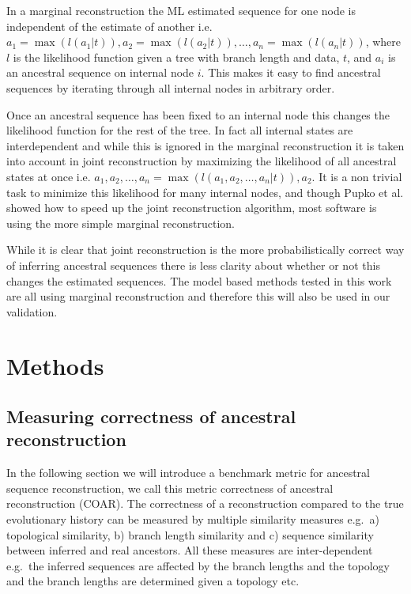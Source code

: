 In a marginal reconstruction the ML estimated sequence for one node is independent of the estimate of another i.e. $a_1 = \operatorname{max}(l(a_1 | t)), a_2 = \operatorname{max}(l(a_2 | t)), \hdots, a_n = \operatorname{max}(l(a_n | t))$, where $l$ is the likelihood function given a tree with branch length and data, $t$, and $a_i$ is an ancestral sequence on internal node $i$.
This makes it easy to find ancestral sequences by iterating through all internal nodes in arbitrary order.

Once an ancestral sequence has been fixed to an internal node this changes the likelihood function for the rest of the tree.
In fact all internal states are interdependent and while this is ignored in the marginal reconstruction it is taken into account in joint reconstruction by maximizing the likelihood of all ancestral states at once i.e. $a_1, a_2, \hdots, a_n = \operatorname{max}(l(a_1, a_2, \hdots, a_n | t)), a_2$.
It is a non trivial task to minimize this likelihood for many internal nodes, and though Pupko et al. \cite{pupko2000fast} showed how to speed up the joint reconstruction algorithm, most software is using the more simple marginal reconstruction.

While it is clear that joint reconstruction is the more probabilistically correct way of inferring ancestral sequences there is less clarity about whether or not this changes the estimated sequences.
The model based methods tested in this work are all using marginal reconstruction and therefore this will also be used in our validation.






\section{Methods}

\subsection{Measuring correctness of ancestral reconstruction}
In the following section we will introduce a benchmark metric for ancestral sequence reconstruction, we call this metric correctness of ancestral reconstruction (COAR).
The correctness of a reconstruction compared to the true evolutionary history can be measured by multiple similarity measures e.g.\ a) topological similarity, b) branch length similarity and c) sequence similarity between inferred and real ancestors.
All these measures are inter-dependent e.g.\ the inferred sequences are affected by the branch lengths and the topology and the branch lengths are determined given a topology etc.

